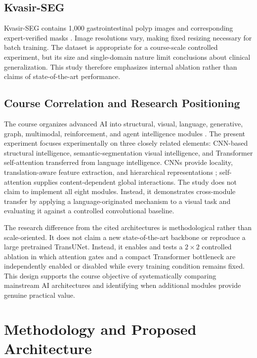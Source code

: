 \documentclass[a4paper,10pt]{article}
\begin{document}
\subsection{Kvasir-SEG}

Kvasir-SEG contains 1,000 gastrointestinal polyp images and corresponding expert-verified masks \cite{jha2020kvasir}. Image resolutions vary, making fixed resizing necessary for batch training. The dataset is appropriate for a course-scale controlled experiment, but its size and single-domain nature limit conclusions about clinical generalization. This study therefore emphasizes internal ablation rather than claims of state-of-the-art performance.

\subsection{Course Correlation and Research Positioning}

The course organizes advanced AI into structural, visual, language, generative, graph, multimodal, reinforcement, and agent intelligence modules \cite{hitsz2026aai}. The present experiment focuses experimentally on three closely related elements: CNN-based structural intelligence, semantic-segmentation visual intelligence, and Transformer self-attention transferred from language intelligence. CNNs provide locality, translation-aware feature extraction, and hierarchical representations \cite{goodfellow2016deep}; self-attention supplies content-dependent global interactions. The study does not claim to implement all eight modules. Instead, it demonstrates cross-module transfer by applying a language-originated mechanism to a visual task and evaluating it against a controlled convolutional baseline.

The research difference from the cited architectures is methodological rather than scale-oriented. It does not claim a new state-of-the-art backbone or reproduce a large pretrained TransUNet. Instead, it enables and tests a $2\times2$ controlled ablation in which attention gates and a compact Transformer bottleneck are independently enabled or disabled while every training condition remains fixed. This design supports the course objective of systematically comparing mainstream AI architectures and identifying when additional modules provide genuine practical value.


\section{Methodology and Proposed Architecture}
\label{sec:method}
\end{document}
